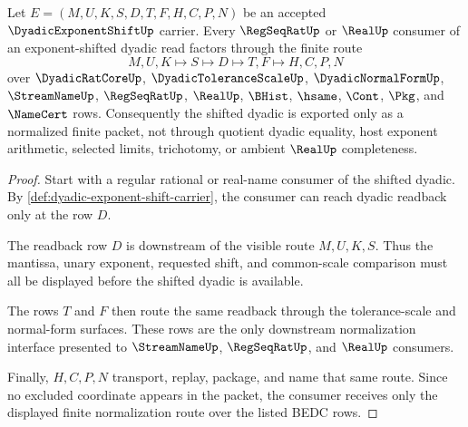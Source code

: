 \begin{theorem}
\label{thm:dyadic-exponent-shift-normalization-handoff}
Let $E=(M,U,K,S,D,T,F,H,C,P,N)$ be an accepted $\DyadicExponentShiftUp$ carrier. Every $\RegSeqRatUp$ or $\RealUp$ consumer of an exponent-shifted dyadic read factors through the finite route
$$
M,U,K \longmapsto S \longmapsto D \longmapsto T,F \longmapsto H,C,P,N
$$
over $\DyadicRatCoreUp$, $\DyadicToleranceScaleUp$, $\DyadicNormalFormUp$, $\StreamNameUp$, $\RegSeqRatUp$, $\RealUp$, $\BHist$, $\hsame$, $\Cont$, $\Pkg$, and $\NameCert$ rows. Consequently the shifted dyadic is exported only as a normalized finite packet, not through quotient dyadic equality, host exponent arithmetic, selected limits, trichotomy, or ambient $\RealUp$ completeness.
\end{theorem}
\begin{proof}
Start with a regular rational or real-name consumer of the shifted dyadic. By \autoref{def:dyadic-exponent-shift-carrier}, the consumer can reach dyadic readback only at the row $D$.

The readback row $D$ is downstream of the visible route $M,U,K,S$. Thus the mantissa, unary exponent, requested shift, and common-scale comparison must all be displayed before the shifted dyadic is available.

The rows $T$ and $F$ then route the same readback through the tolerance-scale and normal-form surfaces. These rows are the only downstream normalization interface presented to $\StreamNameUp$, $\RegSeqRatUp$, and $\RealUp$ consumers.

Finally, $H,C,P,N$ transport, replay, package, and name that same route. Since no excluded coordinate appears in the packet, the consumer receives only the displayed finite normalization route over the listed BEDC rows.
\end{proof}

